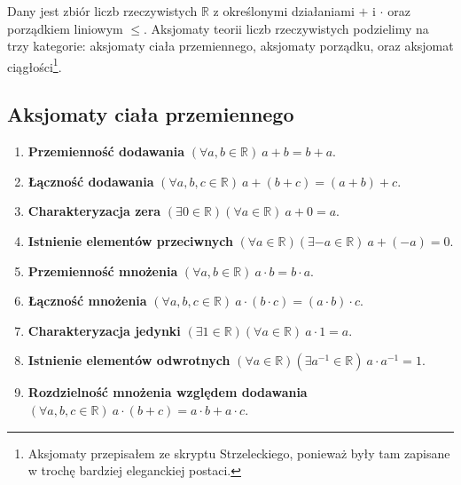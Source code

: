 \documentclass{article}
\newcommand{\R}{\mathbb{R}}
\begin{document}
Dany jest zbiór liczb rzeczywistych \(\R\) z określonymi działaniami $+$ i $\cdot$
oraz porządkiem liniowym $\le$.
Aksjomaty teorii liczb rzeczywistych podzielimy na
trzy kategorie: aksjomaty ciała przemiennego, aksjomaty porządku, oraz aksjomat
ciągłości\footnote{Aksjomaty przepisałem ze skryptu Strzeleckiego, ponieważ
były tam zapisane w trochę bardziej eleganckiej postaci.}.

\subsection*{{\color{darkred} Aksjomaty ciała przemiennego}} 
\begin{enumerate}[label=(\arabic*)]
    \item \textbf{Przemienność dodawania}
    \((\forall a,b\in\R)\ a+b=b+a\).
    \item \textbf{Łączność dodawania}
    \((\forall a,b,c\in\R)\ a+(b+c)=(a+b)+c\).
    \item \textbf{Charakteryzacja zera}
    \((\exists 0\in\R)(\forall a\in\R)\ a+0=a\).
    \item \textbf{Istnienie elementów przeciwnych}
    \((\forall a\in\R)(\exists -a\in\R)\ a+(-a)=0\).
    \item \textbf{Przemienność mnożenia}
    \((\forall a,b\in\R)\ a\cdot b=b\cdot a\).
    \item  \textbf{Łączność mnożenia}
    \((\forall a,b,c\in\R)\ a\cdot(b\cdot c)=(a\cdot b)\cdot c\).
    \item \textbf{Charakteryzacja jedynki}
    \((\exists 1\in\R)(\forall a\in\R)\ a\cdot 1=a\).
    \item \textbf{Istnienie elementów odwrotnych}
    \((\forall a\in\R)(\exists a^{-1}\in\R)\ a\cdot a^{-1}=1\).
    \item \textbf{Rozdzielność mnożenia względem dodawania}
    \((\forall a,b,c\in\R)\ a\cdot(b+c)=a\cdot b + a\cdot c\).
\end{enumerate}
\end{document}
